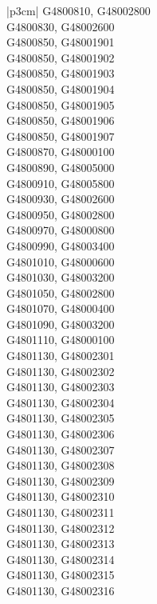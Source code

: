 \begin{customLongTable}{ |p{3cm}| }
G4800810, G48002800 \\ \hline
G4800830, G48002600 \\ \hline
G4800850, G48001901 \\ \hline
G4800850, G48001902 \\ \hline
G4800850, G48001903 \\ \hline
G4800850, G48001904 \\ \hline
G4800850, G48001905 \\ \hline
G4800850, G48001906 \\ \hline
G4800850, G48001907 \\ \hline
G4800870, G48000100 \\ \hline
G4800890, G48005000 \\ \hline
G4800910, G48005800 \\ \hline
G4800930, G48002600 \\ \hline
G4800950, G48002800 \\ \hline
G4800970, G48000800 \\ \hline
G4800990, G48003400 \\ \hline
G4801010, G48000600 \\ \hline
G4801030, G48003200 \\ \hline
G4801050, G48002800 \\ \hline
G4801070, G48000400 \\ \hline
G4801090, G48003200 \\ \hline
G4801110, G48000100 \\ \hline
G4801130, G48002301 \\ \hline
G4801130, G48002302 \\ \hline
G4801130, G48002303 \\ \hline
G4801130, G48002304 \\ \hline
G4801130, G48002305 \\ \hline
G4801130, G48002306 \\ \hline
G4801130, G48002307 \\ \hline
G4801130, G48002308 \\ \hline
G4801130, G48002309 \\ \hline
G4801130, G48002310 \\ \hline
G4801130, G48002311 \\ \hline
G4801130, G48002312 \\ \hline
G4801130, G48002313 \\ \hline
G4801130, G48002314 \\ \hline
G4801130, G48002315 \\ \hline
G4801130, G48002316 \\ \hline

\end{customLongTable}
